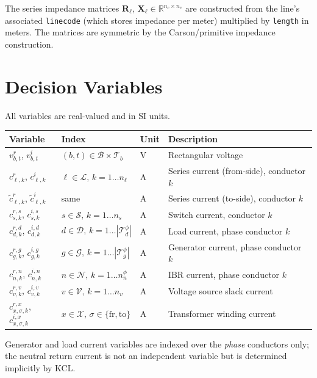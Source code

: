 \documentclass[11pt,a4paper]{article}
\newcommand{\R}{\mathbb{R}}
\newcommand{\mc}[1]{\mathcal{#1}}
\newcommand{\Rmat}{\mathbf{R}}
\newcommand{\Xmat}{\mathbf{X}}
\begin{document}
The series impedance matrices $\Rmat_\ell$, $\Xmat_\ell \in \R^{n_c \times n_c}$
are constructed from the line's associated \texttt{linecode} (which stores
impedance per meter) multiplied by \texttt{length} in meters.  The matrices are
symmetric by the Carson/primitive impedance construction.

\section{Decision Variables}

All variables are real-valued and in SI units.

\begin{center}
\renewcommand{\arraystretch}{1.25}
\begin{tabular}{@{}llll@{}}
\toprule
Variable & Index & Unit & Description \\
\midrule
$v^r_{b,t}$, $v^i_{b,t}$   & $(b,t)\in\mc{B}\times\mc{T}_b$ & V & Rectangular voltage \\
$c^r_{\ell,k}$, $c^i_{\ell,k}$ & $\ell\in\mc{L},\,k=1\ldots n_\ell$ & A & Series current (from-side), conductor $k$ \\
$\tilde{c}^r_{\ell,k}$, $\tilde{c}^i_{\ell,k}$ & same & A & Series current (to-side), conductor $k$ \\
$c^{r,s}_{s,k}$, $c^{i,s}_{s,k}$ & $s\in\mc{S},\,k=1\ldots n_s$ & A & Switch current, conductor $k$ \\
$c^{r,d}_{d,k}$, $c^{i,d}_{d,k}$ & $d\in\mc{D},\,k=1\ldots|\mc{T}_d^\phi|$ & A & Load current, phase conductor $k$ \\
$c^{r,g}_{g,k}$, $c^{i,g}_{g,k}$ & $g\in\mc{G},\,k=1\ldots|\mc{T}_g^\phi|$ & A & Generator current, phase conductor $k$ \\
$c^{r,n}_{n,k}$, $c^{i,n}_{n,k}$ & $n\in\mc{N},\,k=1\ldots n^\phi_n$ & A & IBR current, phase conductor $k$ \\
$c^{r,v}_{v,k}$, $c^{i,v}_{v,k}$ & $v\in\mc{V},\,k=1\ldots n_v$ & A & Voltage source slack current \\
$c^{r,x}_{x,\sigma,k}$, $c^{i,x}_{x,\sigma,k}$ & $x\in\mc{X},\,\sigma\in\{\text{fr},\text{to}\}$ & A & Transformer winding current \\
\bottomrule
\end{tabular}
\end{center}

Generator and load current variables are indexed over the \emph{phase}
conductors only; the neutral return current is not an independent variable but
is determined implicitly by KCL.
\end{document}
